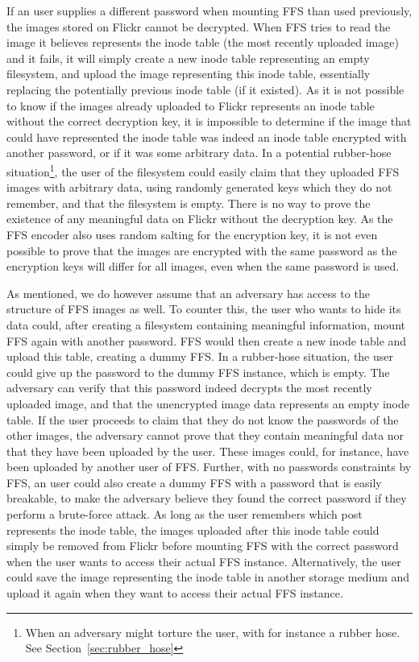 If an user supplies a different password when mounting FFS than used previously, the images stored on Flickr cannot be decrypted. When FFS tries to read the image it believes represents the inode table (the most recently uploaded image) and it fails, it will simply create a new inode table representing an empty filesystem, and upload the image representing this inode table, essentially replacing the potentially previous inode table (if it existed). As it is not possible to know if the images already uploaded to Flickr represents an inode table without the correct decryption key, it is impossible to determine if the image that could have represented the inode table was indeed an inode table encrypted with another password, or if it was some arbitrary data. In a potential rubber-hose situation\footnote{When an adversary might torture the user, with for instance a rubber hose. See Section~\ref{sec:rubber_hose}}, the user of the filesystem could easily claim that they uploaded FFS images with arbitrary data, using randomly generated keys which they do not remember, and that the filesystem is empty. There is no way to prove the existence of any meaningful data on Flickr without the decryption key. As the FFS encoder also uses random salting for the encryption key, it is not even possible to prove that the images are encrypted with the same password as the encryption keys will differ for all images, even when the same password is used. 

As mentioned, we do however assume that an adversary has access to the structure of FFS images as well. To counter this, the user who wants to hide its data could, after creating a filesystem containing meaningful information, mount FFS again with another password. FFS would then create a new inode table and upload this table, creating a dummy FFS. In a rubber-hose situation, the user could give up the password to the dummy FFS instance, which is empty. The adversary can verify that this password indeed decrypts the most recently uploaded image, and that the unencrypted image data represents an empty inode table. If the user proceeds to claim that they do not know the passwords of the other images, the adversary cannot prove that they contain meaningful data nor that they have been uploaded by the user. These images could, for instance, have been uploaded by another user of FFS. Further, with no passwords constraints by FFS, an user could also create a dummy FFS with a password that is easily breakable, to make the adversary believe they found the correct password if they perform a brute-force attack. As long as the user remembers which post represents the inode table, the images uploaded after this inode table could simply be removed from Flickr before mounting FFS with the correct password when the user wants to access their actual FFS instance. Alternatively, the user could save the image representing the inode table in another storage medium and upload it again when they want to access their actual FFS instance.

